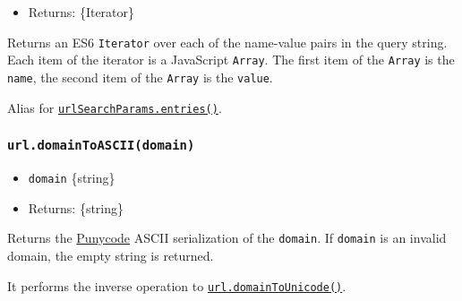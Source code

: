 \begin{itemize}
\tightlist
\item
  Returns: \{Iterator\}
\end{itemize}

Returns an ES6 \texttt{Iterator} over each of the name-value pairs in
the query string. Each item of the iterator is a JavaScript
\texttt{Array}. The first item of the \texttt{Array} is the
\texttt{name}, the second item of the \texttt{Array} is the
\texttt{value}.

Alias for
\hyperref[urlsearchparamsentries]{\texttt{urlSearchParams.entries()}}.

\begin{Shaded}
\begin{Highlighting}[]
\OperatorTok{=}  \NormalTok{(}\NormalTok{)}\OperatorTok{;}
\NormalTok{ (}\NormalTok{ [name}\OperatorTok{,}\NormalTok{ value] }
  \OperatorTok{,}\OperatorTok{;}
\NormalTok{\}}
\end{Highlighting}
\end{Shaded}

\subsubsection{\texorpdfstring{\texttt{url.domainToASCII(domain)}}{url.domainToASCII(domain)}}\label{url.domaintoasciidomain}

\begin{itemize}
\tightlist
\item
  \texttt{domain} \{string\}
\item
  Returns: \{string\}
\end{itemize}

Returns the
\href{https://tools.ietf.org/html/rfc5891\#section-4.4}{Punycode} ASCII
serialization of the \texttt{domain}. If \texttt{domain} is an invalid
domain, the empty string is returned.

It performs the inverse operation to
\hyperref[urldomaintounicodedomain]{\texttt{url.domainToUnicode()}}.

